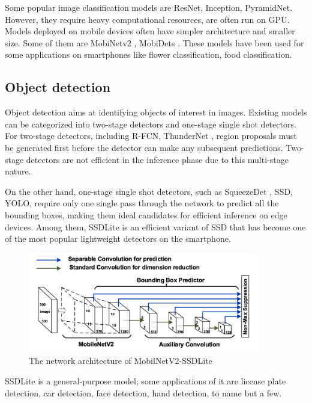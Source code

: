 Some popular image classification models are ResNet, Inception, PyramidNet. However, they require heavy computational resources, are often run on GPU. Models deployed on mobile devices often have simpler architecture and smaller size. Some of them are MobiNetv2 \cite{mobilenetv2}, MobiDets \cite{mobiledets}. These models have been used for some applications on smartphones like flower classification, food classification.


\subsection{Object detection}
Object detection aims at identifying objects of interest in images. Existing models can be categorized into two-stage detectors and one-stage single shot
detectors. For two-stage detectors, including R-FCN, ThunderNet \cite{thundernet}, region proposals must be generated first before the detector can make any subsequent predictions. Two-stage detectors are not efficient in the inference phase due to this multi-stage nature. 

On the other hand, one-stage single shot detectors, such as SqueezeDet \cite{squeezenet}, SSD, YOLO, require only one single pass through the network to predict all the bounding boxes, making them ideal candidates for efficient inference on edge devices. Among them, SSDLite is an efficient variant of SSD that has become one of the most popular lightweight detectors on the smartphone. 

\begin{figure} [H]
    \centering
    \includegraphics[width=0.9\textwidth]{chapter2/image/ssdlite.png}
    \caption{The network architecture of MobilNetV2-SSDLite}
    \label{fig:cnn}
\end{figure}

SSDLite is a general-purpose model; some applications of it are license plate detection, car detection, face detection, hand detection, to name but a few.

